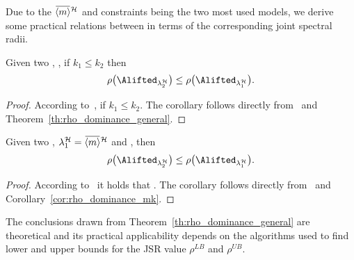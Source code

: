 %
Due to the $\overbar{\left< m \right>}^{\strat}$ and \removed{$\mks{}{\strat}$} constraints being the two most used models, we derive  some practical relations between  in terms of the corresponding joint spectral radii.
\begin{corollary}%
    \label{cor:rho_dominance_mk}%
    Given two \ewhc{}, , if $k_1 \leq k_2$ then
    $$
        \rho\bigl(\Alifted_{\lambda^\strat_2}\bigr) \leq \rho\bigl(\Alifted_{\lambda^\strat_1}\bigr).
    $$
%
    \begin{proof}
        According to~\cite{Wu:2020},  if $k_1 \leq k_2$.
        The corollary follows directly from~\cite{Wu:2020} and Theorem~\ref{th:rho_dominance_general}.
    \end{proof}
\end{corollary}
%
\begin{corollary}%
    \label{cor:rho_dominance_cons}%
    Given two \ewhc{}, $\lambda^\strat_1 = \overbar{\left<m\right>}^{\strat}$ and , then
    $$
        \rho\bigl(\Alifted_{\lambda^\strat_2}\bigr) \leq \rho\bigl(\Alifted_{\lambda^\strat_1}\bigr).
    $$
%
    \begin{proof}
        According to~\cite{Maggio:2020} it holds that . The corollary follows directly from~\cite{Maggio:2020} and Corollary~\ref{cor:rho_dominance_mk}.
    \end{proof}
\end{corollary}
%
The conclusions drawn from Theorem~\ref{th:rho_dominance_general} are theoretical and its practical applicability depends on the algorithms used to find lower and upper bounds for the JSR value $\rho^{LB}$ and $\rho^{UB}$.
